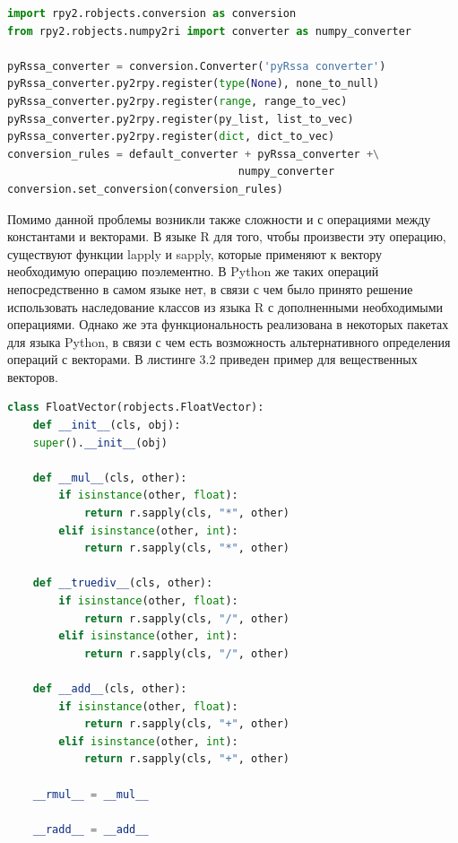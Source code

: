 \documentclass[specialist,
			   substylefile = spbu_report.rtx,
			   subf,href,colorlinks=true, 12pt]{disser}
\begin{document}
\noindent
\begin{minipage}{\linewidth}
\begin{lstlisting}[language=Python, caption=Конвертация из Python в R.]
import rpy2.robjects.conversion as conversion
from rpy2.robjects.numpy2ri import converter as numpy_converter

pyRssa_converter = conversion.Converter('pyRssa converter')
pyRssa_converter.py2rpy.register(type(None), none_to_null)
pyRssa_converter.py2rpy.register(range, range_to_vec)
pyRssa_converter.py2rpy.register(py_list, list_to_vec)
pyRssa_converter.py2rpy.register(dict, dict_to_vec)
conversion_rules = default_converter + pyRssa_converter +\
                                    numpy_converter
conversion.set_conversion(conversion_rules)
\end{lstlisting}
\end{minipage}

Помимо данной проблемы возникли также сложности и с операциями между константами и векторами. В языке R для того, чтобы произвести эту операцию, существуют функции lapply и sapply, которые применяют к вектору необходимую операцию поэлементно. В Python же таких операций непосредственно в самом языке нет, в связи с чем было принято решение использовать наследование классов из языка R с дополненными необходимыми операциями. Однако же эта функциональность реализована в некоторых пакетах \cite{habr-doc} для языка Python, в связи с чем есть возможность альтернативного определения операций с векторами. В листинге 3.2 приведен пример для вещественных векторов.

\begin{lstlisting}[language=Python, caption=Наследование для FloatVector.]
class FloatVector(robjects.FloatVector):
	def __init__(cls, obj):
	super().__init__(obj)
	
	def __mul__(cls, other):
		if isinstance(other, float):
			return r.sapply(cls, "*", other)
		elif isinstance(other, int):
			return r.sapply(cls, "*", other)
	
	def __truediv__(cls, other):
		if isinstance(other, float):
			return r.sapply(cls, "/", other)
		elif isinstance(other, int):
			return r.sapply(cls, "/", other)
	
	def __add__(cls, other):
		if isinstance(other, float):
			return r.sapply(cls, "+", other)
		elif isinstance(other, int):
			return r.sapply(cls, "+", other)
	
	__rmul__ = __mul__
	
	__radd__ = __add__
\end{lstlisting}
\end{document}
